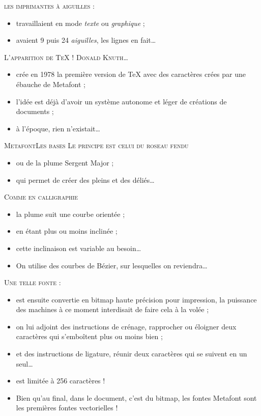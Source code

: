 \documentclass[12pt,a4paper,twocolumn]{book} %
\begin{document}
	{\textsc{les imprimantes à aiguilles :}}
	\begin{itemize}
	\item travaillaient en mode \textit{texte} ou \textit{graphique} ;
	\item avaient 9 puis 24 \textit{aiguilles}, les lignes en fait\dots
	\end{itemize}
	    {\textsc{L'apparition de TeX !}
	      {\textsc{Donald \textsc{Knuth}\dots}}
	      \begin{itemize}
	      \item crée en 1978 la première version de TeX avec des caractères crées par une ébauche de Metafont ;
	      \item l'idée est déjà d'avoir un système autonome et léger de créations de documents ;
	      \item à l'époque, rien n'existait\dots
	      \end{itemize}	
	          {\textsc{MetafontLes bases}
	            {\textsc{Le principe est celui du roseau fendu}}
		    \begin{itemize}
		    \item ou de la plume Sergent Major ;
		    \item qui permet de créer des pleins et des déliés\dots
		    \end{itemize}	
		    
	            {\textsc{Comme en calligraphie}}
		    \begin{itemize}
		    \item la plume suit une courbe orientée ;
		    \item en étant plus ou moins inclinée ;
		    \item cette inclinaison est variable au besoin\dots
		    \item On utilise des courbes de Bézier, sur lesquelles on reviendra\dots
		    \end{itemize}	

                    {\textsc{Une telle fonte :}}
		    \begin{itemize}
		    \item est ensuite convertie en bitmap haute précision pour impression,
		      la puissance des machines à ce moment interdisait de faire cela à la volée ;
		    \item on lui adjoint des instructions de crénage, rapprocher ou éloigner deux caractères
		      qui s'emboîtent plus ou moins bien ;
		    \item et des instructions de ligature, réunir deux caractères qui se suivent en un seul\dots
		    \item est limitée à 256 caractères !
		    \item Bien qu'au final, dans le document, c'est du bitmap, les fontes Metafont sont les premières fontes vectorielles !
		    \end{itemize}	
		    
}}
\end{document}
